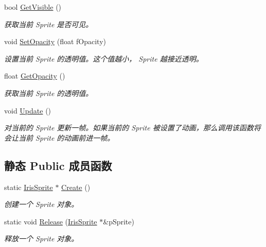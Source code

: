 \begin{DoxyCompactItemize}
bool \hyperlink{class_iris2_d_1_1_iris_sprite_afb65bc13767cb566233cf4c14b4288bd}{Get\+Visible} ()
\begin{DoxyCompactList}\small\item\em 获取当前 Sprite 是否可见。 \end{DoxyCompactList}\item 
void \hyperlink{class_iris2_d_1_1_iris_sprite_a8f32660ac464af824864c2af8c883039}{Set\+Opacity} (float f\+Opacity)
\begin{DoxyCompactList}\small\item\em 设置当前 Sprite 的透明值。这个值越小， Sprite 越接近透明。 \end{DoxyCompactList}\item 
float \hyperlink{class_iris2_d_1_1_iris_sprite_a59358690f1becb15facd176a9bba4096}{Get\+Opacity} ()
\begin{DoxyCompactList}\small\item\em 获取当前 Sprite 的透明值。 \end{DoxyCompactList}\item 
\mbox{\label{class_iris2_d_1_1_iris_sprite_a755c2896a54ad43d68db2993477b900a}} 
void \hyperlink{class_iris2_d_1_1_iris_sprite_a755c2896a54ad43d68db2993477b900a}{Update} ()
\begin{DoxyCompactList}\small\item\em 对当前的 Sprite 更新一帧。如果当前的 Sprite 被设置了动画，那么调用该函数将会让当前 Sprite 的动画前进一帧。 \end{DoxyCompactList}\end{DoxyCompactItemize}
\subsection*{静态 Public 成员函数}
\begin{DoxyCompactItemize}
\item 
static \hyperlink{class_iris2_d_1_1_iris_sprite}{Iris\+Sprite} $\ast$ \hyperlink{class_iris2_d_1_1_iris_sprite_ab68ea873fcd8521324c8497455dee852}{Create} ()
\begin{DoxyCompactList}\small\item\em 创建一个 Sprite 对象。 \end{DoxyCompactList}\item 
static void \hyperlink{class_iris2_d_1_1_iris_sprite_aa225c6483e0282375187b092ea0cecf9}{Release} (\hyperlink{class_iris2_d_1_1_iris_sprite}{Iris\+Sprite} $\ast$\&p\+Sprite)
\begin{DoxyCompactList}\small\item\em 释放一个 Sprite 对象。 \end{DoxyCompactList}\end{DoxyCompactItemize}


